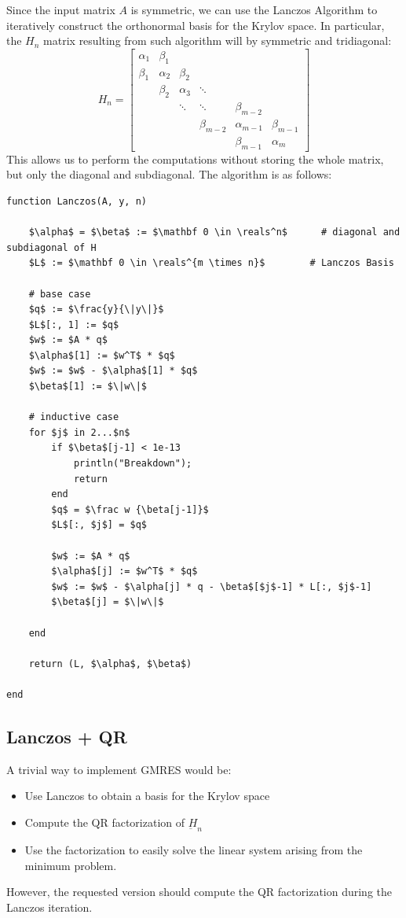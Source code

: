 \documentclass{article}
\newcommand{\reals}{\mathbb R}
\newcommand{\hess}{\underbar H}
\begin{document}
 Since the input matrix $A$ is symmetric, we can use the Lanczos Algorithm to iteratively construct the orthonormal basis for the Krylov space. In particular, the $H_n$ matrix resulting from such algorithm will by symmetric and tridiagonal:
 \[H_n = \begin{bmatrix}
    \alpha_1 & \beta_1\\
    \beta_1 & \alpha_2 & \beta_2\\
    &\beta_2 & \alpha_3 & \ddots\\
    &&\ddots & \ddots & \beta_{m-2}\\
    &&&\beta_{m-2} &\alpha_{m-1}& \beta_{m-1}\\
    &&&& \beta_{m-1} & \alpha_m
   \end{bmatrix}
\]
This allows us to perform the computations without storing the whole matrix, but only the diagonal and subdiagonal. The algorithm is as follows:
\begin{algorithm} \caption{Lanczos Algorithm}
\begin{lstlisting}
function Lanczos(A, y, n)
    
    $\alpha$ = $\beta$ := $\mathbf 0 \in \reals^n$      # diagonal and subdiagonal of H
    $L$ := $\mathbf 0 \in \reals^{m \times n}$        # Lanczos Basis
    
    # base case
    $q$ := $\frac{y}{\|y\|}$
    $L$[:, 1] := $q$
    $w$ := $A * q$
    $\alpha$[1] := $w^T$ * $q$
    $w$ := $w$ - $\alpha$[1] * $q$
    $\beta$[1] := $\|w\|$

    # inductive case
    for $j$ in 2...$n$
        if $\beta$[j-1] < 1e-13
            println("Breakdown");
            return
        end
        $q$ = $\frac w {\beta[j-1]}$
        $L$[:, $j$] = $q$
        
        $w$ := $A * q$
        $\alpha$[j] := $w^T$ * $q$
        $w$ := $w$ - $\alpha[j] * q - \beta$[$j$-1] * L[:, $j$-1]
        $\beta$[j] = $\|w\|$
        
    end 
    
    return (L, $\alpha$, $\beta$)

end
\end{lstlisting}
\end{algorithm}

\newpage
\subsection{Lanczos + QR}
A trivial way to implement GMRES would be:
\begin{itemize}
 \item Use Lanczos to obtain a basis for the Krylov space
 \item Compute the QR factorization of $\hess_n$
 \item Use the factorization to easily solve the linear system arising from the minimum problem.
\end{itemize}
However, the requested version should compute the QR factorization during the Lanczos iteration.
\end{document}
